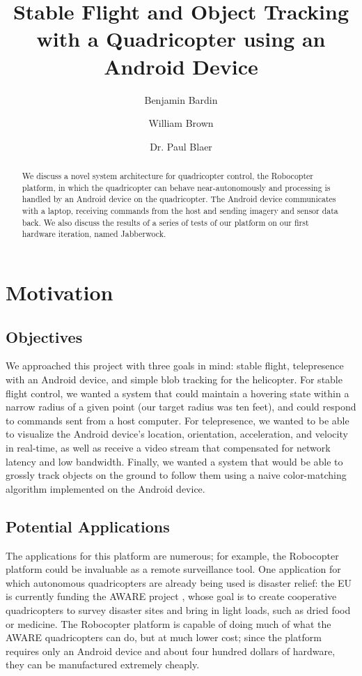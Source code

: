 \documentclass[letterpaper]{article}
\title{Stable Flight and Object Tracking with a Quadricopter using an
  Android Device}
\author{Benjamin Bardin \and William Brown 
  \and Dr. Paul Blaer}
\begin{document}
\maketitle

\begin{abstract}
  We discuss a novel system architecture for quadricopter control, the
  Robocopter platform, in which the quadricopter can behave
  near-autonomously and processing is handled by an Android device on
  the quadricopter. The Android device communicates with a laptop,
  receiving commands from the host and sending imagery and sensor data
  back. We also discuss the results of a series of tests of our
  platform on our first hardware iteration, named Jabberwock.
\end{abstract}
\tableofcontents
\pagebreak

\section{Motivation}
\subsection{Objectives}
We approached this project with three goals in mind: stable flight,
telepresence with an Android device, and simple blob tracking for the
helicopter. For stable flight control, we wanted a system that could
maintain a hovering state within a narrow radius of a given point (our
target radius was ten feet), and could respond to commands sent from a
host computer. For telepresence, we wanted to be able to visualize the
Android device's location, orientation, acceleration, and velocity in
real-time, as well as receive a video stream that compensated for
network latency and low bandwidth. Finally, we wanted a system that
would be able to grossly track objects on the ground to follow them
using a naive color-matching algorithm implemented on the Android
device.

\subsection{Potential Applications}
The applications for this platform are numerous; for example, the
Robocopter platform could be invaluable as a remote surveillance
tool. One application for which autonomous quadricopters are already
being used is disaster relief: the EU is currently funding the AWARE
project \citep{aware}, whose goal is to create cooperative
quadricopters to survey disaster sites and bring in light loads, such
as dried food or medicine. The Robocopter platform is capable of doing
much of what the AWARE quadricopters can do, but at much lower cost;
since the platform requires only an Android device and about four
hundred dollars of hardware, they can be manufactured extremely
cheaply.
\end{document}
